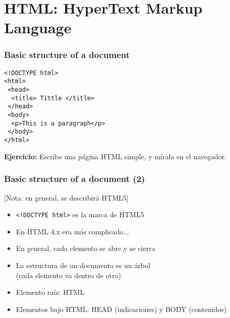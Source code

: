 %


\section{HTML: HyperText Markup Language}


\begin{frame}[fragile]
\frametitle{Basic structure of a document}

\begin{verbatim}
<!DOCTYPE html>
<html>
 <head>
  <title> Tittle </title>
 </head>
 <body>
  <p>This is a paragraph</p>
 </body>
</html>
\end{verbatim}

\textbf{Ejercicio:} Escribe una página HTML simple, y mírala en el navegador.

\end{frame}



\begin{frame}[fragile]
\frametitle{Basic structure of a document (2)}

[Nota: en general, se describirá HTML5]

\begin{itemize}
\item \verb|<!DOCTYPE html>| es la marca de HTML5
\item En HTML 4.x era más complicado...
\item En general, cada elemento se abre y se cierra
\item La estructura de un documento es un árbol \\
  (cada elemento va dentro de otro)
\item Elemento raíz: HTML
\item Elementos bajo HTML: HEAD (indicaciones) y BODY (contenidos) 
\end{itemize}

\end{frame}


